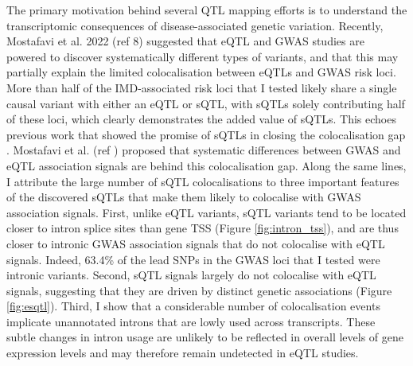 The primary motivation behind several QTL mapping efforts is to understand the transcriptomic consequences of disease-associated genetic variation. Recently, Mostafavi et al. 2022 (ref 8) suggested that eQTL and GWAS studies are powered to discover systematically different types of variants, and that this may partially explain the limited colocalisation between eQTLs and GWAS risk loci. More than half of the IMD-associated risk loci that I tested likely share a single causal variant with either an eQTL or sQTL, with sQTLs solely contributing half of these loci, which clearly demonstrates the added value of sQTLs. This echoes previous work that showed the promise of sQTLs in closing the colocalisation gap \cite{Mu2021-ar,Kim-Hellmuth2020-gz,Liu2018-fh}. Mostafavi et al. (ref \cite{Mostafavi2022-tg}) proposed that systematic differences between GWAS and eQTL association signals are behind this colocalisation gap. Along the same lines, I attribute the large number of sQTL colocalisations to three important features of the discovered sQTLs that make them likely to colocalise with GWAS association signals. First, unlike eQTL variants, sQTL variants tend to be located closer to intron splice sites than gene TSS (Figure \ref{fig:intron_tss}), and are thus closer to intronic GWAS association signals that do not colocalise with eQTL signals. Indeed, 63.4\% of the lead SNPs in the GWAS loci that I tested were intronic variants. Second, sQTL signals largely do not colocalise with eQTL signals, suggesting that they are driven by distinct genetic associations (Figure \ref{fig:esqtl}). Third, I show that a considerable number of colocalisation events implicate unannotated introns that are lowly used across transcripts. These subtle changes in intron usage are unlikely to be reflected in overall levels of gene expression levels and may therefore remain undetected in eQTL studies. \\


